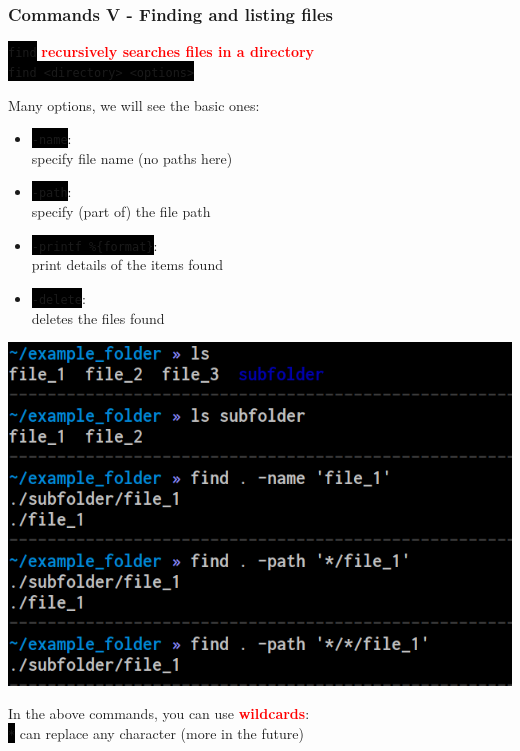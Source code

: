 \documentclass[unknownkeysallowed, 10pt, a4 paper, handout]{beamer}
\newcommand{\focus}[1]{\textbf{\textcolor{red}{#1}}}
\newcommand{\code}[1]{\colorbox{black}{\color{green}\texttt{#1}}}
\newcommand{\sidebyside}[5]{
  \begin{minipage}{#1\textwidth}
    #2
  \end{minipage} #3 \begin{minipage}{#4\textwidth}
    #5
  \end{minipage}
}
\begin{document}
\begin{frame}
  \begin{center}
    \frametitle{Commands V - Finding and listing files}

    \code{find} \focus{recursively searches files in a directory}\\
    \code{find <directory> <options>}

    \vspace{3mm}

    Many options, we will see the basic ones:

    \vspace{3mm}

    \sidebyside{0.52}{
      \begin{itemize}
        \item \code{-name}:\\
          specify file name (no paths here)
        \item \code{-path}:\\
          specify (part of) the file path
        \item \code{-printf \%\{format\}}:\\
          print details of the items found
        \item \code{-delete}:\\
          deletes the files found
      \end{itemize}
    }{\hfill}{0.45}{
      \begin{center}
        \includegraphics[width=1.00\textwidth]{pics/find.png}
      \end{center}
    }

    \vspace{3mm}

    In the above commands, you can use \focus{wildcards}:\\
    \code{*} can replace any character (more in the future)
  \end{center}
\end{frame}
\end{document}
